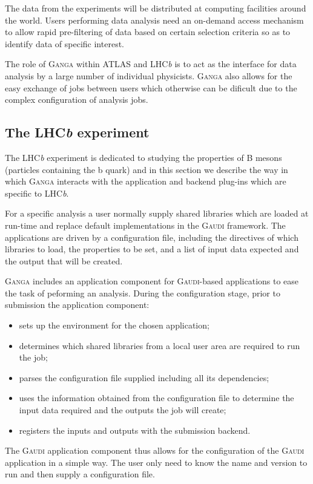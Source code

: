 \documentclass{elsart}
\def\lhcb {LHC{\em b\/}\xspace}
\def\atlas {ATLAS\xspace}
\def\ganga {\textsc{Ganga}\xspace}
\def\gaudi {\textsc{Gaudi}\xspace}
\begin{document}
The data from the experiments will be distributed at computing facilities
around the world. Users performing data analysis need an on-demand access
mechanism to allow rapid pre-filtering of data based on certain selection
criteria so as to identify data of specific interest.

The role of \ganga within \atlas and \lhcb is to act as the interface for data
analysis by a large number of individual physicists. \ganga also allows for
the easy exchange of jobs between users which otherwise can be dificult due to
the complex configuration of analysis jobs.

\subsection{The \lhcb experiment}
\label{sec:lhcb}

The \lhcb experiment is dedicated to studying the properties of B
mesons (particles containing the b quark) and in this section we
describe the way in which \ganga interacts with the application and
backend plug-ins which are specific to \lhcb.

For a specific analysis a user normally supply shared libraries which are
loaded at run-time and replace default implementations in the \gaudi
framework.  The applications are driven by a configuration file, including the
directives of which libraries to load, the properties to be set, and a list of
input data expected and the output that will be created.

\ganga includes an application component for \gaudi-based applications to ease
the task of peforming an analysis. During the configuration stage, prior to
submission the application component:
\begin{itemize}
\item sets up the environment for the chosen application;
\item determines which shared libraries from a local user area are required to
  run the job;
\item parses the configuration file supplied including all its dependencies;
\item uses the information obtained from the configuration file to determine
  the input data required and the outputs the job will create;
\item registers the inputs and outputs with the submission backend.
\end{itemize}
The \gaudi application component thus allows for the configuration of the
\gaudi application in a simple way. The user only need to know the name and
version to run and then supply a configuration file.
\end{document}
